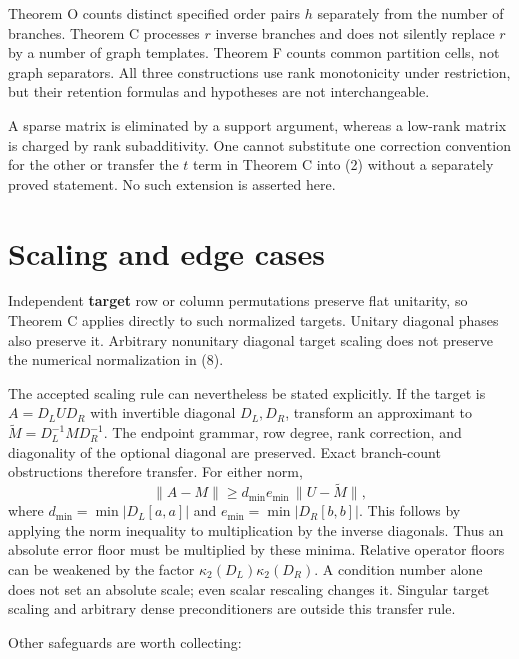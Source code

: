 \documentclass[
  11pt,
]{article}
\begin{document}
Theorem O counts distinct specified order pairs \(h\) separately from
the number of branches. Theorem C processes \(r\) inverse branches and
does not silently replace \(r\) by a number of graph templates. Theorem
F counts common partition cells, not graph separators. All three
constructions use rank monotonicity under restriction, but their
retention formulas and hypotheses are not interchangeable.

A sparse matrix is eliminated by a support argument, whereas a low-rank
matrix is charged by rank subadditivity. One cannot substitute one
correction convention for the other or transfer the \(t\) term in
Theorem C into (2) without a separately proved statement. No such
extension is asserted here.

\section{Scaling and edge cases}\label{scaling-and-edge-cases}

Independent \textbf{target} row or column permutations preserve flat
unitarity, so Theorem C applies directly to such normalized targets.
Unitary diagonal phases also preserve it. Arbitrary nonunitary diagonal
target scaling does not preserve the numerical normalization in (8).

The accepted scaling rule can nevertheless be stated explicitly. If the
target is \(A=D_LUD_R\) with invertible diagonal \(D_L,D_R\), transform
an approximant to \(\widetilde M=D_L^{-1}MD_R^{-1}\). The endpoint
grammar, row degree, rank correction, and diagonality of the optional
diagonal are preserved. Exact branch-count obstructions therefore
transfer. For either norm, \[
 \|A-M\|\ge d_{\min}e_{\min}\,\|U-\widetilde M\|,
\] where \(d_{\min}=\min|D_L[a,a]|\) and \(e_{\min}=\min|D_R[b,b]|\).
This follows by applying the norm inequality to multiplication by the
inverse diagonals. Thus an absolute error floor must be multiplied by
these minima. Relative operator floors can be weakened by the factor
\(\kappa_2(D_L)\kappa_2(D_R)\). A condition number alone does not set an
absolute scale; even scalar rescaling changes it. Singular target
scaling and arbitrary dense preconditioners are outside this transfer
rule.

Other safeguards are worth collecting:
\end{document}
